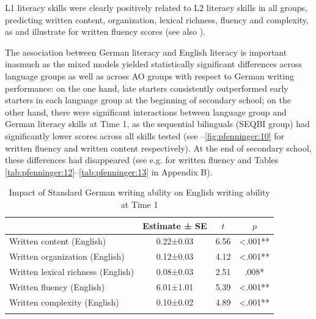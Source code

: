 \documentclass[output=paper,modfonts,nonflat,newtxmath]{langsci/langscibook}
\begin{document}
L1 literacy skills were clearly positively related to L2 literacy skills in all groups, predicting written content, organization, lexical richness, fluency and complexity, as  and  illustrate for written fluency scores (see also \citealt{Pfenninger2014}).

The association between German literacy and English literacy is important inasmuch as the mixed models yielded statistically significant differences across language groups as well as across AO groups with respect to German writing performance: on the one hand, late starters consistently outperformed early starters in each language group at the beginning of secondary school; on the other hand, there were significant interactions between language group and German literacy skills at Time 1, as the sequential bilinguals (SEQBI group) had significantly lower scores across all skills tested (see --\ref{fig:pfenninger:10} for written fluency and written content respectively). At the end of secondary school, these differences had disappeared (see e.g.  for written fluency and Tables \ref{tab:pfenninger:12}--\ref{tab:pfenninger:13} in Appendix B).%

\begin{table}
\caption{\label{tab:pfenninger:10}Impact of Standard German writing ability on English writing ability at Time 1}
\begin{tabular}{lS[table-format=-1.3,parse-numbers=false]S[table-format=1.2]S[table-format=<1.3,table-space-text-post = ab]}
\lsptoprule
& {Estimate ± SE} & {$t$}  & {$p$}\\\midrule
Written content (English) & 0.22±0.03 & 6.56 & <.001**\\
Written organization (English) & 0.12±0.03 & 4.12 & <.001**\\
Written lexical richness (English) & 0.08±0.03 & 2.51 & .008*\\
Written fluency (English) & 6.01±1.01 & 5.39 & <.001**\\
Written complexity (English) & 0.10±0.02 & 4.89 & <.001**\\
\lspbottomrule
\end{tabular}
\end{table}
\end{document}
